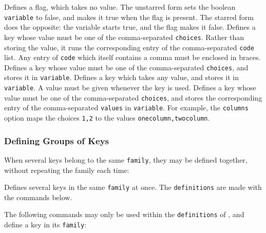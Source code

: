 				{
					Defines a flag, which takes no value. The unstarred form sets the boolean \texttt{variable} to false, and makes it true when the flag is present. The starred form does the opposite: the variable starts true, and the flag makes it false.
				}
				{
					Defines a key whose value must be one of the comma-separated \texttt{choices}. Rather than storing the value, it runs the corresponding entry of the comma-separated \texttt{code} list. Any entry of \texttt{code} which itself contains a comma must be enclosed in braces.
				}
				{
					Defines a key whose value must be one of the comma-separated \texttt{choices}, and stores it in \texttt{variable}.
				}
				{
					Defines a key which takes any value, and stores it in \texttt{variable}. A value must be given whenever the key is used.
				}
				{
					Defines a key whose value must be one of the comma-separated \texttt{choices}, and stores the corresponding entry of the comma-separated \texttt{values} in \texttt{variable}. For example, the \texttt{columns} option maps the choices \texttt{1,2} to the values \texttt{onecolumn,twocolumn}.
				}

			\subsubsection{Defining Groups of Keys}\label{S:ThemeKeysGroup}

				When several keys belong to the same \texttt{family}, they may be defined together, without repeating the family each time:

				{
					Defines several keys in the same \texttt{family} at once. The \texttt{definitions} are made with the commands below.

				}

				The following commands may only be used within the \texttt{definitions} of , and define a key in its \texttt{family}:

